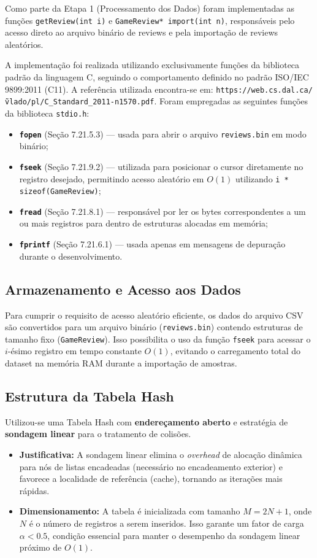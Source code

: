 \documentclass[11pt, a4paper]{article}
\begin{document}
Como parte da Etapa 1 (Processamento dos Dados) foram implementadas as funções \texttt{getReview(int i)} e \texttt{GameReview* import(int n)}, responsáveis pelo acesso direto ao arquivo binário de reviews e pela importação de reviews aleatórios.

A implementação foi realizada utilizando exclusivamente funções da biblioteca padrão da linguagem C, seguindo o comportamento definido no padrão ISO/IEC 9899:2011 (C11). A referência utilizada encontra-se em: \texttt{https://web.cs.dal.ca/\~vlado/pl/C\_Standard\_2011-n1570.pdf}. Foram empregadas as seguintes funções da biblioteca \texttt{stdio.h}:

\begin{itemize}
    \item \textbf{\texttt{fopen}} (Seção 7.21.5.3) — usada para abrir o arquivo \texttt{reviews.bin} em modo binário;
    \item \textbf{\texttt{fseek}} (Seção 7.21.9.2) — utilizada para posicionar o cursor diretamente no registro desejado, permitindo acesso aleatório em $O(1)$ utilizando \texttt{i * sizeof(GameReview)};
    \item \textbf{\texttt{fread}} (Seção 7.21.8.1) — responsável por ler os bytes correspondentes a um ou mais registros para dentro de estruturas alocadas em memória;
    \item \textbf{\texttt{fprintf}} (Seção 7.21.6.1) — usada apenas em mensagens de depuração durante o desenvolvimento.
\end{itemize}

\subsection{Armazenamento e Acesso aos Dados}
Para cumprir o requisito de acesso aleatório eficiente, os dados do arquivo CSV são convertidos para um arquivo binário (\texttt{reviews.bin}) contendo estruturas de tamanho fixo (\texttt{GameReview}). Isso possibilita o uso da função \texttt{fseek} para acessar o $i$-ésimo registro em tempo constante $O(1)$, evitando o carregamento total do dataset na memória RAM durante a importação de amostras.

\subsection{Estrutura da Tabela Hash}
Utilizou-se uma Tabela Hash com \textbf{endereçamento aberto} e estratégia de \textbf{sondagem linear} para o tratamento de colisões.
\begin{itemize}
    \item \textbf{Justificativa:} A sondagem linear elimina o \textit{overhead} de alocação dinâmica para nós de listas encadeadas (necessário no encadeamento exterior) e favorece a localidade de referência (cache), tornando as iterações mais rápidas.
    \item \textbf{Dimensionamento:} A tabela é inicializada com tamanho $M = 2N + 1$, onde $N$ é o número de registros a serem inseridos. Isso garante um fator de carga $\alpha < 0.5$, condição essencial para manter o desempenho da sondagem linear próximo de $O(1)$.
\end{itemize}
\end{document}
